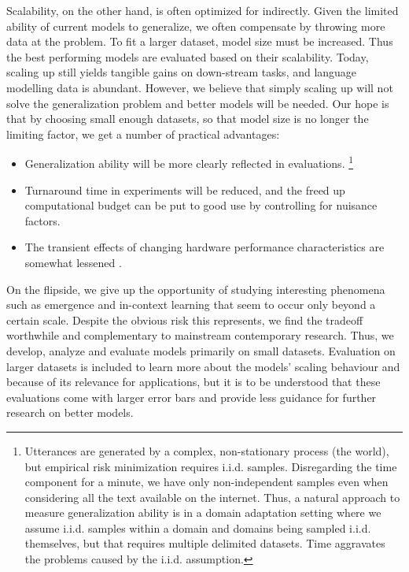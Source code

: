 \documentclass[12pt,a4paper,oneside]{book}
\begin{document}
Scalability, on the other hand, is often optimized for indirectly.
Given the limited ability of current models to generalize, we often compensate by throwing more data at the problem.
To fit a larger dataset, model size must be increased.
Thus the best performing models are evaluated based on their scalability. %
Today, scaling up still yields tangible gains on down-stream tasks, and language modelling data is abundant.
However, we believe that simply scaling up will not solve the generalization problem and better models will be needed.
Our hope is that by choosing small enough datasets, so that model size is no longer the limiting factor, we get a number of practical advantages:
\begin{itemize}
\item Generalization ability will be more clearly reflected in evaluations.
\footnote{Utterances are generated by a complex, non-stationary process (the world), but empirical risk minimization requires i.i.d. samples.
Disregarding the time component for a minute, we have only non-independent samples even when considering all the text available on the internet.
Thus, a natural approach to measure generalization ability is in a domain adaptation setting where we assume i.i.d. samples within a domain and domains being sampled i.i.d. themselves, but that requires multiple delimited datasets.
Time aggravates the problems caused by the i.i.d. assumption.}
\item Turnaround time in experiments will be reduced, and the freed up computational budget can be put to good use by controlling for nuisance factors.
\item The transient effects of changing hardware performance characteristics are somewhat lessened \citep{DBLP:journals/corr/abs-2009-06489}.
\end{itemize}
On the flipside, we give up the opportunity of studying interesting phenomena such as emergence \citep{wei2022emergent} and in-context learning \citep{lampinen2022incontext} that seem to occur only beyond a certain scale.
Despite the obvious risk this represents, we find the tradeoff worthwhile and complementary to mainstream contemporary research.
Thus, we develop, analyze and evaluate models primarily on small datasets.
Evaluation on larger datasets is included to learn more about the models' scaling behaviour and because of its relevance for applications, but it is to be understood that these evaluations come with larger error bars and provide less guidance for further research on better models.
\end{document}
